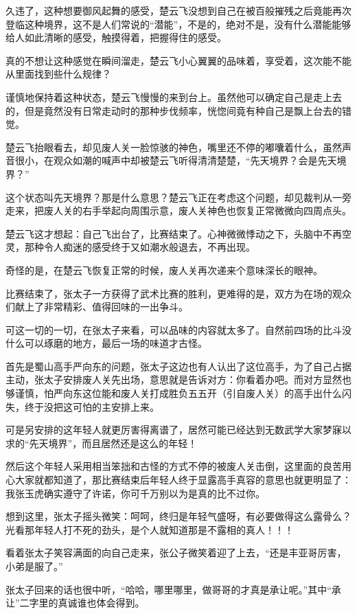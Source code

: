 久违了，这种想要御风起舞的感受，楚云飞没想到自己在被百般摧残之后竟能再次登临这种境界，这不是人们常说的“潜能”，不是的，绝对不是，没有什么潜能能够给人如此清晰的感受，触摸得着，把握得住的感受。

真的不想让这种感觉在瞬间溜走，楚云飞小心翼翼的品味着，享受着，这次能不能从里面找到些什么规律？

谨慎地保持着这种状态，楚云飞慢慢的来到台上。虽然他可以确定自己是走上去的，但是竟然没有日常走动时的那种步伐频率，恍惚间竟有种自己是飘上台去的错觉。

楚云飞抬眼看去，却见废人关一脸惊骇的神色，嘴里还不停的嘟囔着什么，虽然声音很小，在观众如潮的喊声中却被楚云飞听得清清楚楚，“先天境界？会是先天境界？”

这个状态叫先天境界？那是什么意思？楚云飞正在考虑这个问题，却见裁判从一旁走来，把废人关的右手举起向周围示意，废人关神色也恢复正常微微向四周点头。

楚云飞这才想起：自己飞出台了，比赛结束了。心神微微悸动之下，头脑中不再空灵，那种令人痴迷的感受终于又如潮水般退去，不再出现。

奇怪的是，在楚云飞恢复正常的时候，废人关再次递来个意味深长的眼神。

比赛结束了，张太子一方获得了武术比赛的胜利，更难得的是，双方为在场的观众们献上了非常精彩、值得回味的一出争斗。

可这一切的一切，在张太子来看，可以品味的内容就太多了。自然前四场的比斗没什么可以琢磨的地方，最后一场的味道才古怪。

首先是蜀山高手严向东的问题，张太子这边也有人认出了这位高手，为了自己占据主动，张太子安排废人关先出场，意思就是告诉对方：你看着办吧。而对方显然也够谨慎，怕严向东这位能和废人关打成胜负五五开（引自废人关）的高手出什么闪失，终于没把这可怕的主安排上来。

可是另安排的这年轻人就更厉害得离谱了，居然可能已经达到无数武学大家梦寐以求的“先天境界”，而且居然还是这么的年轻！

然后这个年轻人采用相当笨拙和古怪的方式不停的被废人关击倒，这里面的良苦用心大家就都知道了，那比赛结束后年轻人终于显露高手真容的意思也就更明显了：我张玉虎确实遵守了许诺，你可千万别以为是真的比不过你。

想到这里，张太子摇头微笑：呵呵，终归是年轻气盛呀，有必要做得这么露骨么？光看那年轻人打不死的劲头，是个人就知道那是不露相的真人！！！

看着张太子笑容满面的向自己走来，张公子微笑着迎了上去，“还是丰亚哥厉害，小弟是服了。”

张太子回来的话也很中听，“哈哈，哪里哪里，做哥哥的才真是承让呢。”其中“承让”二字里的真诚谁也体会得到。

